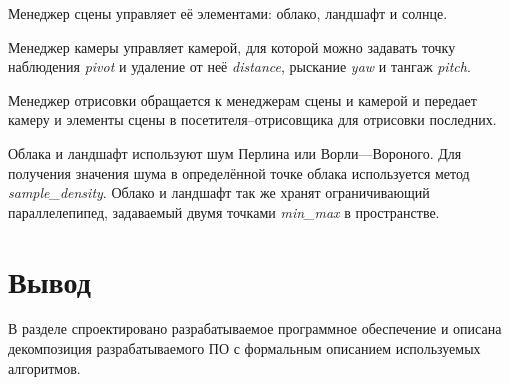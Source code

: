 Менеджер сцены управляет её элементами: облако, ландшафт и солнце.

Менеджер камеры управляет камерой, для которой можно задавать точку наблюдения \textit{pivot} и удаление от неё \textit{distance}, рыскание \textit{yaw} и тангаж \textit{pitch}.

Менеджер отрисовки обращается к менеджерам сцены и камерой и передает камеру и элементы сцены в посетителя--отрисовщика для отрисовки последних.

Облака и ландшафт используют шум Перлина или Ворли---Вороного. Для получения значения шума в определённой точке облака используется метод \textit{sample\_density}. Облако и ландшафт так же хранят ограничивающий параллелепипед, задаваемый двумя точками \textit{min\_max} в пространстве.

\section*{Вывод}
В разделе спроектировано разрабатываемое программное обеспечение и описана декомпозиция разрабатываемого ПО с формальным описанием используемых алгоритмов.
